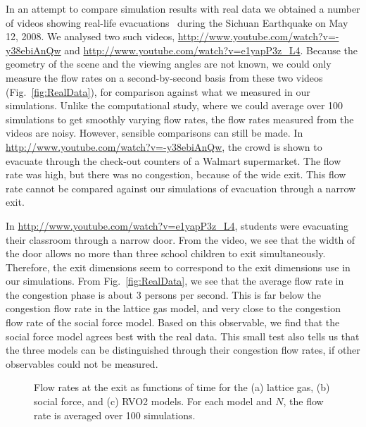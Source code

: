 In an attempt to compare simulation results with real data we obtained a number of videos showing real-life evacuations~\cite{Yang2013,Yang2011} during the Sichuan Earthquake on May 12, 2008. We analysed two such videos, \url{http://www.youtube.com/watch?v=-y38ebiAnQw} and \url{http://www.youtube.com/watch?v=e1yapP3z_L4}.
Because the geometry of the scene and the viewing angles are not known, we could only measure the flow rates on a second-by-second basis from these two videos (Fig.~\ref{fig:RealData}), for comparison against what we measured in our simulations. Unlike the computational study, where we could average over 100 simulations to get smoothly varying flow rates, the flow rates measured from the videos are noisy. However, sensible comparisons can still be made. In \url{http://www.youtube.com/watch?v=-y38ebiAnQw}, the crowd is shown to evacuate through the check-out counters of a Walmart supermarket. The flow rate was high, but there was no congestion, because of the wide exit. This flow rate cannot be compared against our simulations of evacuation through a narrow exit.

In \url{http://www.youtube.com/watch?v=e1yapP3z_L4}, students were evacuating their classroom through a narrow door. From the video, we see that the width of the door allows no more than three school children to exit simultaneously. Therefore, the exit dimensions seem to correspond to the exit dimensions use in our simulations. From Fig.~\ref{fig:RealData}, we see that the average flow rate in the congestion phase is about 3 persons per second. This is far below the congestion flow rate in the lattice gas model, and very close to the congestion flow rate of the social force model. Based on this observable, we find that the social force model agrees best with the real data. This small test also tells us that the three models can be distinguished through their congestion flow rates, if other observables could not be measured.


\begin{figure}[htbp]

\caption{Flow rates at the exit as functions of time for the (a) lattice gas, (b) social force, and (c) RVO2 models. For each model and $N$, the flow rate is averaged over 100 simulations.}
\label{fig:FlowRate}
\end{figure}

